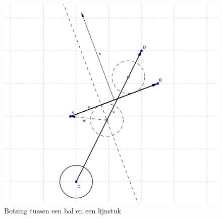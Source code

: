 \documentclass[12pt,a4paper]{article}
\begin{document}
	\begin{figure}[h]
		\centerline{\includegraphics[width=\textwidth]{Plaatjes/Bal-Lijn.png}}
		\caption{Botsing tussen een bal en een lijnstuk}
		\label{bal-lijn}
	\end{figure}
	
\end{document}
